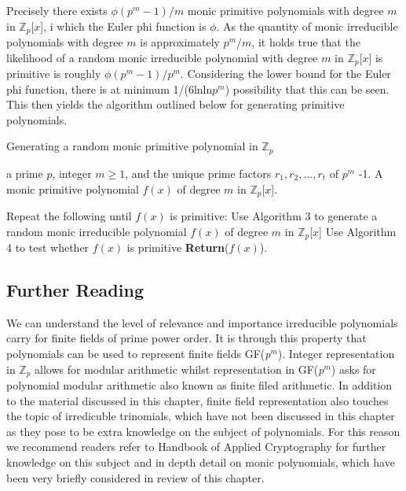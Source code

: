 \documentclass[iwp,first]{luthesis}
\begin{document}
\newpage

Precisely there exists $\phi(p^{m}-1)/m$ monic primitive polynomials with degree $m$ in $\mathbb{Z}_p$[$x$], i which the Euler phi function is $\phi$. As the quantity of monic irreducible polynomials with degree $m$ is approximately $p^{m}/m$, it holds true that the likelihood of a random monic irreducible polynomial with degree $m$ in $\mathbb{Z}_p$[$x$] is primitive is roughly $\phi(p^{m}-1)/p^{m}$. Considering the lower bound for the Euler phi function, there is at minimum 1/(6lnln$p^m$) possibility that this can be seen. This then yields the algorithm outlined below for generating primitive polynomials.

\begin{algorithm}
\caption{Generating a random monic primitive polynomial in $\mathbb{Z}_p$}
\begin{algorithmic}
\REQUIRE a prime $p$, integer $m \geq 1$, and the unique prime factors $r_1, r_2,...,r_t$ of $p^m$ -1.
\ENSURE A monic primitive polynomial $f(x)$ of degree $m$ in $\mathbb{Z}_p$[$x$].
\begin{enumerate}
\STATE Repeat the following until $f(x)$ is primitive:
\STATE Use Algorithm 3 to generate a random monic irreducible polynomial $f(x)$ of degree $m$ in $\mathbb{Z}_{p}$[$x$]
\STATE Use Algorithm 4 to test whether $f(x)$ is primitive
\STATE \textbf{Return}($f(x)$).
\end{enumerate}
\end{algorithmic}
\end{algorithm}

\subsection{Further Reading}

We can understand the level of relevance and importance irreducible polynomials carry for finite fields of prime power order. It is through this property that polynomials can be used to represent finite fields GF(\textit{p}$^m$). Integer representation in $\mathbb{Z}_p$ allows for modular arithmetic whilst representation in GF(\textit{p}$^m$) asks for polynomial modular arithmetic also known as finite filed arithmetic. In addition to the material discussed in this chapter, finite field representation also touches the topic of irredicuble trinomials, which have not been discussed in this chapter as they pose to be extra knowledge on the subject of polynomials. For this reason we recommend readers refer to \cite{HAC} Handbook of Applied Cryptography for further knowledge on this subject and in depth detail on monic polynomials, which have been very briefly considered in review of this chapter.
\end{document}
